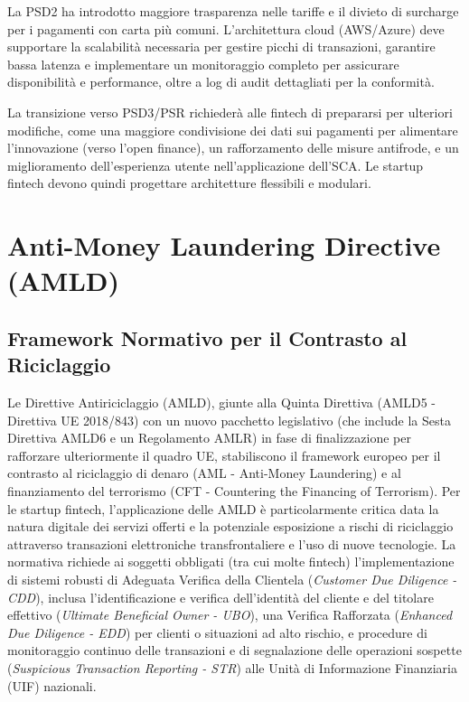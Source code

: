 La PSD2 ha introdotto maggiore trasparenza nelle tariffe e il divieto di surcharge per i pagamenti con carta più comuni. L'architettura cloud (AWS/Azure) deve supportare la scalabilità necessaria per gestire picchi di transazioni, garantire bassa latenza e implementare un monitoraggio completo per assicurare disponibilità e performance, oltre a log di audit dettagliati per la conformità.

La transizione verso PSD3/PSR richiederà alle fintech di prepararsi per ulteriori modifiche, come una maggiore condivisione dei dati sui pagamenti per alimentare l'innovazione (verso l'open finance), un rafforzamento delle misure antifrode, e un miglioramento dell'esperienza utente nell'applicazione dell'SCA. Le startup fintech devono quindi progettare architetture flessibili e modulari.

\section{Anti-Money Laundering Directive (AMLD)}
\label{sec:amld}

\subsection{Framework Normativo per il Contrasto al Riciclaggio}
Le Direttive Antiriciclaggio (AMLD), giunte alla Quinta Direttiva (AMLD5 - Direttiva UE 2018/843) con un nuovo pacchetto legislativo (che include la Sesta Direttiva AMLD6 e un Regolamento AMLR) in fase di finalizzazione per rafforzare ulteriormente il quadro UE, stabiliscono il framework europeo per il contrasto al riciclaggio di denaro (AML - Anti-Money Laundering) e al finanziamento del terrorismo (CFT - Countering the Financing of Terrorism). Per le startup fintech, l'applicazione delle AMLD è particolarmente critica data la natura digitale dei servizi offerti e la potenziale esposizione a rischi di riciclaggio attraverso transazioni elettroniche transfrontaliere e l'uso di nuove tecnologie. La normativa richiede ai soggetti obbligati (tra cui molte fintech) l'implementazione di sistemi robusti di Adeguata Verifica della Clientela (\textit{Customer Due Diligence - CDD}), inclusa l'identificazione e verifica dell'identità del cliente e del titolare effettivo (\textit{Ultimate Beneficial Owner - UBO}), una Verifica Rafforzata (\textit{Enhanced Due Diligence - EDD}) per clienti o situazioni ad alto rischio, e procedure di monitoraggio continuo delle transazioni e di segnalazione delle operazioni sospette (\textit{Suspicious Transaction Reporting - STR}) alle Unità di Informazione Finanziaria (UIF) nazionali.

